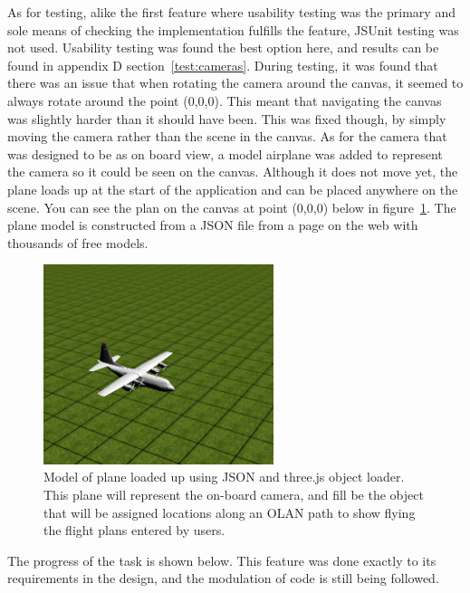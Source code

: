 As for testing, alike the first feature where usability testing was the primary and sole means of checking the implementation fulfills the feature, JSUnit testing was not used. Usability testing was found the best option here, and results can be found in appendix D section~\ref{test:cameras}. During testing, it was found that there was an issue that when rotating the camera around the canvas, it seemed to always rotate around the point (0,0,0). This meant that navigating the canvas was slightly harder than it should have been. This was fixed though, by simply moving the camera rather than the scene in the canvas. As for the camera that was designed to be as on board view, a model airplane was added to represent the camera so it could be seen on the canvas. Although it does not move yet, the plane loads up at the start of the application and can be placed anywhere on the scene. You can see the plan on the canvas at point (0,0,0) below in figure~\ref{fig:plane}. The plane model is constructed from a JSON file from a page on the web with thousands of free models.

\clearpage

\begin{figure}[h!]
  \centering
      \includegraphics[width=0.6\textwidth]{images/plane.png}
  \caption{Model of plane loaded up using JSON and three.js object loader. This plane will represent the on-board camera, and fill be the object that will be assigned locations along an OLAN path to show flying the flight plans entered by users.}
  \label{fig:plane}
\end{figure}

The progress of the task is shown below. This feature was done exactly to its requirements in the design, and the modulation of code is still being followed.

